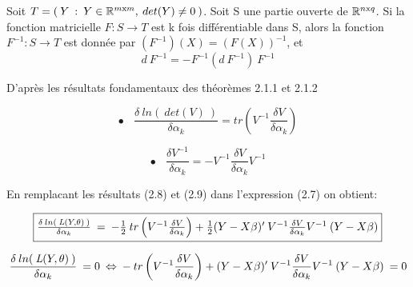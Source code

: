 \documentclass[11pt,fleqn]{book} %
\begin{document}
	\vspace{1em}
	
	\begin{theorem}
		Soit $T=\left(\: Y\::\:Y\in\mathbb{R}^{m\textnormal{x}m},\:det(Y)\neq 0 \:\right)$. Soit S une partie ouverte de $\mathbb{R}^{n\textnormal{x}q}$. Si la fonction matricielle $F:S\rightarrow T$ est k fois différentiable dans S, alors la fonction $F^{-1}:S\rightarrow T$ est donnée par $(F^{-1})(X)=(F(X))^{-1}$, et 
		\[ d\:F^{-1}=-F^{-1}(d\:F^{-1})\:F^{-1}\]
	\end{theorem}
	
	\vspace{1em}
	
	D'après les résultats fondamentaux des théorèmes 2.1.1 et 2.1.2 
	
	\begin{equation} 
		\bullet \:\:\:\: \frac{ \delta \:ln(\:det(V)\:) }{\delta \alpha_k}= tr\left( V^{-1} \frac{ \delta V }{\delta \alpha_k} \right) 
	\end{equation}
	
	\begin{equation} 
		\bullet \:\:\:\: \frac{ \delta V^{-1} }{\delta \alpha_k} = -V^{-1} \frac{ \delta V }{\delta \alpha_k} V^{-1}
	\end{equation}
	
	\vspace{1em}
	
	En remplacant les résultats (2.8) et (2.9) dans l'expression (2.7) on obtient:
	
	\begin{equation}
		\fbox{$
			\frac{\delta \: ln( \:\textit{L}(Y,\theta)\:) }{\delta \alpha_k} \:=\: -\frac{1}{2} \: tr\left( V^{-1} \frac{ \delta V }{\delta \alpha_k} \right)  +\frac{1}{2}  (Y-X\beta)'\:V^{-1} \frac{ \delta V }{\delta \alpha_k} V^{-1}\:(Y-X\beta) 
			$}
	\end{equation}
	
	\vspace{1em}
	
	\begin{equation}
		\frac{\delta \: ln( \:\textit{L}(Y,\theta)\:) }{\delta \alpha_k} \:=0 \: \Leftrightarrow\: - \: tr\left( V^{-1} \frac{ \delta V }{\delta \alpha_k} \right)  + (Y-X\beta)'\:V^{-1} \frac{ \delta V }{\delta \alpha_k} V^{-1}\:(Y-X\beta) \:=0 \\
	\end{equation}
	
	\vspace{1em}
	
\end{document}
